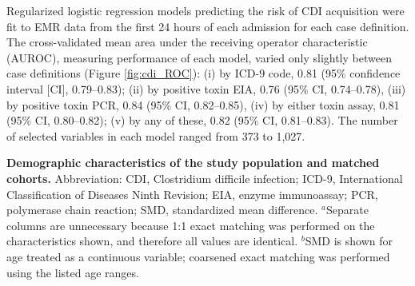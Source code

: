 Regularized logistic regression models predicting the risk of CDI acquisition were fit to EMR data from the first 24 hours of each admission for each case definition. The cross-validated mean area under the receiving operator characteristic (AUROC), measuring performance of each model, varied only slightly between case definitions (Figure \ref{fig:cdi_ROC}): (i) by ICD-9 code, 0.81 (95\% confidence interval [CI], 0.79–0.83); (ii) by positive toxin EIA, 0.76 (95\% CI, 0.74–0.78), (iii) by positive toxin PCR, 0.84 (95\% CI, 0.82–0.85), (iv) by either toxin assay, 0.81 (95\% CI, 0.80–0.82); (v) by any of these, 0.82 (95\% CI, 0.81–0.83). The number of selected variables in each model ranged from 373 to 1,027.

\begin{table*}[ht]
  
  \caption[Demographic characteristics of the study population and matched cohorts]{\textbf{Demographic characteristics of the study population and matched cohorts.} Abbreviation: CDI, Clostridium difficile infection; ICD-9, International Classification of Diseases Ninth Revision; EIA, enzyme immunoassay; PCR, polymerase chain reaction; SMD, standardized mean difference. $^a$Separate columns are unnecessary because 1:1 exact matching was performed on the characteristics shown, and therefore all values are identical. $^b$SMD is shown for age treated as a continuous variable; coarsened exact matching was performed using the listed age ranges.
}
  \label{tab:cdi_pts}
\end{table*}

